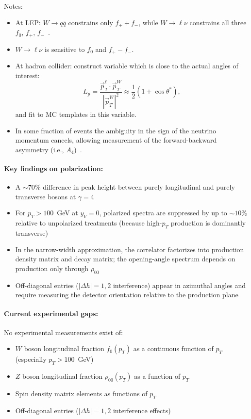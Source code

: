 \documentclass[11pt]{article}
\begin{document}


Notes:
\begin{itemize}
    \item At LEP: $W\to q\bar{q}$ constrains only $f_{+} + f_{-}$, while $W\to \ell\nu$ constrains all three $f_0$, $f_{+}$, $f_{-}$~\cite{L3:2002ygr}.
    \item $W\to \ell\nu$ is sensitive to $f_0$ and $f_+ - f_-$.
    \item At hadron collider: construct variable which is close to the actual angles of interest:
    \begin{equation}
        L_p = \frac{\vec{p}_T^\ell \cdot \vec{p}_T^W}{\left|\vec{p}_T^W\right|^2} \approx \frac{1}{2}(1 + \cos\theta^*),
    \end{equation}
    and fit to MC templates in this variable. 
    \item In some fraction of events the ambiguity in the sign of the neutrino momentum cancels, allowing measurement of the forward-backward asymmetry (i.e., $A_4$)~\cite{ATLAS:2025mlt}. 
\end{itemize}

\paragraph{Key findings on polarization:}
\begin{itemize}
    \item A $\sim 70\%$ difference in peak height between purely longitudinal and purely transverse bosons at $\gamma = 4$
    \item For $p_T > 100$~GeV at $y_V = 0$, polarized spectra are suppressed by up to $\sim 10\%$ relative to unpolarized treatments (because high-$p_T$ production is dominantly transverse)
    \item In the narrow-width approximation, the correlator factorizes into production density matrix and decay matrix; the opening-angle spectrum depends on production only through $\rho_{00}$
    \item Off-diagonal entries ($|\Delta h| = 1, 2$ interference) appear in azimuthal angles and require measuring the detector orientation relative to the production plane
\end{itemize}

\paragraph{Current experimental gaps:}
No experimental measurements exist of:
\begin{itemize}
    \item $W$ boson longitudinal fraction $f_0(p_T)$ as a continuous function of $p_T$ (especially $p_T > 100$~GeV)
    \item $Z$ boson longitudinal fraction $\rho_{00}(p_T)$ as a function of $p_T$
    \item Spin density matrix elements as functions of $p_T$
    \item Off-diagonal entries ($|\Delta h| = 1, 2$ interference effects)
\end{itemize}
\end{document}
